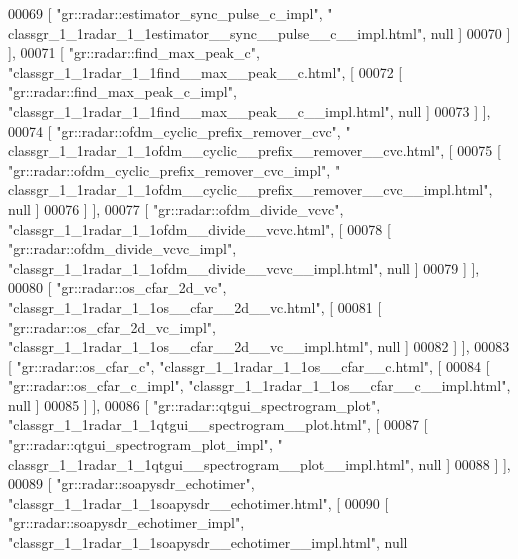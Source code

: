 \begin{DoxyCode}
00069         [ \textcolor{stringliteral}{"gr::radar::estimator\_sync\_pulse\_c\_impl"}, \textcolor{stringliteral}{"
      classgr\_1\_1radar\_1\_1estimator\_\_sync\_\_pulse\_\_c\_\_impl.html"}, null ]
00070       ] ],
00071       [ \textcolor{stringliteral}{"gr::radar::find\_max\_peak\_c"}, \textcolor{stringliteral}{"classgr\_1\_1radar\_1\_1find\_\_max\_\_peak\_\_c.html"}, [
00072         [ \textcolor{stringliteral}{"gr::radar::find\_max\_peak\_c\_impl"}, \textcolor{stringliteral}{"classgr\_1\_1radar\_1\_1find\_\_max\_\_peak\_\_c\_\_impl.html"}, null ]
00073       ] ],
00074       [ \textcolor{stringliteral}{"gr::radar::ofdm\_cyclic\_prefix\_remover\_cvc"}, \textcolor{stringliteral}{"
      classgr\_1\_1radar\_1\_1ofdm\_\_cyclic\_\_prefix\_\_remover\_\_cvc.html"}, [
00075         [ \textcolor{stringliteral}{"gr::radar::ofdm\_cyclic\_prefix\_remover\_cvc\_impl"}, \textcolor{stringliteral}{"
      classgr\_1\_1radar\_1\_1ofdm\_\_cyclic\_\_prefix\_\_remover\_\_cvc\_\_impl.html"}, null ]
00076       ] ],
00077       [ \textcolor{stringliteral}{"gr::radar::ofdm\_divide\_vcvc"}, \textcolor{stringliteral}{"classgr\_1\_1radar\_1\_1ofdm\_\_divide\_\_vcvc.html"}, [
00078         [ \textcolor{stringliteral}{"gr::radar::ofdm\_divide\_vcvc\_impl"}, \textcolor{stringliteral}{"classgr\_1\_1radar\_1\_1ofdm\_\_divide\_\_vcvc\_\_impl.html"}, null ]
00079       ] ],
00080       [ \textcolor{stringliteral}{"gr::radar::os\_cfar\_2d\_vc"}, \textcolor{stringliteral}{"classgr\_1\_1radar\_1\_1os\_\_cfar\_\_2d\_\_vc.html"}, [
00081         [ \textcolor{stringliteral}{"gr::radar::os\_cfar\_2d\_vc\_impl"}, \textcolor{stringliteral}{"classgr\_1\_1radar\_1\_1os\_\_cfar\_\_2d\_\_vc\_\_impl.html"}, null ]
00082       ] ],
00083       [ \textcolor{stringliteral}{"gr::radar::os\_cfar\_c"}, \textcolor{stringliteral}{"classgr\_1\_1radar\_1\_1os\_\_cfar\_\_c.html"}, [
00084         [ \textcolor{stringliteral}{"gr::radar::os\_cfar\_c\_impl"}, \textcolor{stringliteral}{"classgr\_1\_1radar\_1\_1os\_\_cfar\_\_c\_\_impl.html"}, null ]
00085       ] ],
00086       [ \textcolor{stringliteral}{"gr::radar::qtgui\_spectrogram\_plot"}, \textcolor{stringliteral}{"classgr\_1\_1radar\_1\_1qtgui\_\_spectrogram\_\_plot.html"}, [
00087         [ \textcolor{stringliteral}{"gr::radar::qtgui\_spectrogram\_plot\_impl"}, \textcolor{stringliteral}{"
      classgr\_1\_1radar\_1\_1qtgui\_\_spectrogram\_\_plot\_\_impl.html"}, null ]
00088       ] ],
00089       [ \textcolor{stringliteral}{"gr::radar::soapysdr\_echotimer"}, \textcolor{stringliteral}{"classgr\_1\_1radar\_1\_1soapysdr\_\_echotimer.html"}, [
00090         [ \textcolor{stringliteral}{"gr::radar::soapysdr\_echotimer\_impl"}, \textcolor{stringliteral}{"classgr\_1\_1radar\_1\_1soapysdr\_\_echotimer\_\_impl.html"}, null 

\end{DoxyCode}
